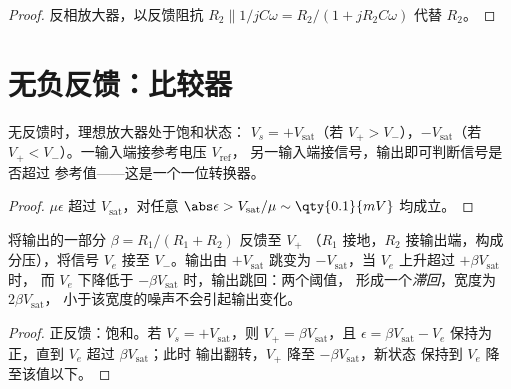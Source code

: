 \begin{proof}
反相放大器，以反馈阻抗 $R_2 \parallel 1/jC\omega
= R_2/(1 + jR_2C\omega)$ 代替 $R_2$。
\end{proof}

\section{无负反馈：比较器}

\begin{proposition}[比较器]\label{prop:b1:operational-amplifier:comparator}
无反馈时，理想放大器处于饱和状态：
$V_s = +V_{\mathrm{sat}}$（若 $V_+ > V_-$），$-V_{\mathrm{sat}}$（若
$V_+ < V_-$）。一输入端接参考电压 $V_{\mathrm{ref}}$，
另一输入端接信号，输出即可判断信号是否超过
参考值——这是一个一位转换器。
\end{proposition}

\begin{proof}
$\mu\epsilon$ 超过 $V_{\mathrm{sat}}$，对任意 $\abs\epsilon >
V_{\mathrm{sat}}/\mu \sim \qty{0.1}{mV}$ 均成立。
\end{proof}

\begin{proposition}[施密特触发器]\label{prop:b1:operational-amplifier:schmitt}
将输出的一部分 $\beta = R_1/(R_1 + R_2)$ 反馈至 $V_+$
（$R_1$ 接地，$R_2$ 接输出端，构成分压），将信号
$V_e$ 接至 $V_-$。输出由 $+V_{\mathrm{sat}}$ 跳变为
$-V_{\mathrm{sat}}$，当 $V_e$ 上升超过 $+\beta V_{\mathrm{sat}}$ 时，
而 $V_e$ 下降低于 $-\beta V_{\mathrm{sat}}$ 时，输出跳回：两个阈值，
形成一个\emph{滞回}，宽度为 $2\beta V_{\mathrm{sat}}$，
小于该宽度的噪声不会引起输出变化。
\end{proposition}

\begin{proof}
正反馈：饱和。若 $V_s = +V_{\mathrm{sat}}$，则 $V_+ =
\beta V_{\mathrm{sat}}$，且 $\epsilon = \beta V_{\mathrm{sat}} - V_e$
保持为正，直到 $V_e$ 超过 $\beta V_{\mathrm{sat}}$；此时
输出翻转，$V_+$ 降至 $-\beta V_{\mathrm{sat}}$，新状态
保持到 $V_e$ 降至该值以下。
\end{proof}

